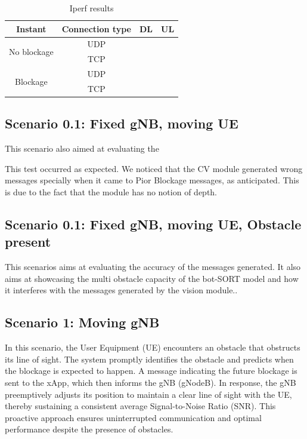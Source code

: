 \begin{table}[h]
    \centering %
    \begin{tabular}{|c|c|c|c|}
        \hline
        \textbf{Instant} & \textbf{Connection type} & \textbf{DL} & \textbf{UL} \\ \hline
        \multirow{2}{*}{No blockage} & UDP & & \\ \cline{2-4}
        & TCP & & \\ \hline
        \multirow{2}{*}{Blockage}    & UDP & & \\ \cline{2-4}
        & TCP & & \\ \hline
    \end{tabular}
    \caption{Iperf results} %
    \label{tab:iperf} %
\end{table}






\subsection{Scenario 0.1: Fixed gNB, moving UE}\label{subsec:scenario-0.1:-fixed-gnb-moving-ue}
This scenario also aimed at evaluating the

This test occurred as expected.
We noticed that the CV module generated wrong messages specially when it came to Pior Blockage messages, as anticipated.
This is due to the fact that the module has no notion of depth.

\subsection{Scenario 0.1: Fixed gNB, moving UE, Obstacle present}\label{subsec:scenario-0.1:-fixed-gnb-moving-ue-obstacle-present}

This scenarios aims at evaluating the accuracy of the messages generated.
It also aims at showcasing the multi obstacle capacity of the bot-SORT model and how it interferes with the messages generated by the vision module..

\subsection{Scenario 1: Moving gNB}\label{subsec:scenario-1:-moving-gnb}
In this scenario, the User Equipment (UE) encounters an obstacle that obstructs its line of sight. %
The system promptly identifies the obstacle and predicts when the blockage is expected to happen.
A message indicating the future blockage is sent to the xApp, which then informs the gNB (gNodeB). In response, the gNB preemptively adjusts its position to maintain a clear line of sight with the UE, thereby sustaining a consistent average Signal-to-Noise Ratio (SNR). This proactive approach ensures uninterrupted communication and optimal performance despite the presence of obstacles.

